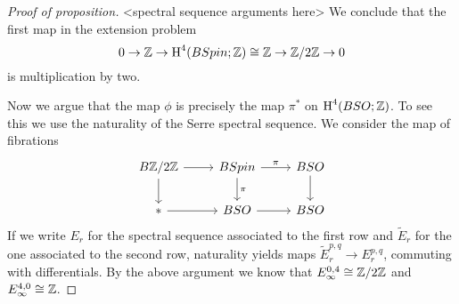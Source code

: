 \documentclass{amsart}
\begin{document}
\begin{proof}[Proof of proposition]
    <spectral sequence arguments here>
    We conclude that the first map in the extension problem
    \begin{equation*}
        0\to \mathbb{Z} \to \operatorname{H}^4(BSpin;\mathbb{Z})\cong\mathbb{Z} \to \mathbb{Z}/2\mathbb{Z} \to 0
    \end{equation*}
    is multiplication by two.

    Now we argue that the map $\phi$ is precisely the map $\pi^*$ on $\operatorname{H}^4(BSO;\mathbb{Z})$.
    To see this we use the naturality of the Serre spectral sequence. We consider the
    map of fibrations
    \begin{equation*}
        \begin{tikzcd}
            B\Z/2\Z \rar\dar & BSpin\rar{\pi}\dar{\pi} & BSO\dar\\
            * \rar & BSO \rar & BSO
        \end{tikzcd}
    \end{equation*}
    If we write $E_r$ for the spectral sequence associated to the first row and
    $\tilde E_r$ for the one associated to the second row, naturality yields maps
    $\tilde E^{p,q}_r \to E^{p,q}_r$, commuting with differentials. By the above
    argument we know that $E_\infty^{0,4}\cong\mathbb{Z}/2\mathbb{Z}$ and $E_\infty^{4,0}\cong\mathbb{Z}$.
\end{proof}





\end{document}

